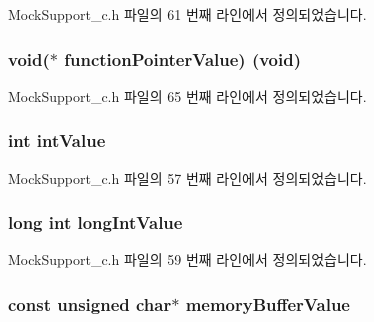 Mock\+Support\+\_\+c.\+h 파일의 61 번째 라인에서 정의되었습니다.

\subsubsection[{\texorpdfstring{function\+Pointer\+Value}{functionPointerValue}}]{\setlength{\rightskip}{0pt plus 5cm}void($\ast$ function\+Pointer\+Value) (void)}\hypertarget{struct_s_mock_value__c_a04eefaf984b7d689bcd2cf4cfd25bff7}{}\label{struct_s_mock_value__c_a04eefaf984b7d689bcd2cf4cfd25bff7}


Mock\+Support\+\_\+c.\+h 파일의 65 번째 라인에서 정의되었습니다.

\subsubsection[{\texorpdfstring{int\+Value}{intValue}}]{\setlength{\rightskip}{0pt plus 5cm}int int\+Value}\hypertarget{struct_s_mock_value__c_a23b7c31b2f6c188e1c281f7be7473f23}{}\label{struct_s_mock_value__c_a23b7c31b2f6c188e1c281f7be7473f23}


Mock\+Support\+\_\+c.\+h 파일의 57 번째 라인에서 정의되었습니다.

\subsubsection[{\texorpdfstring{long\+Int\+Value}{longIntValue}}]{\setlength{\rightskip}{0pt plus 5cm}long int long\+Int\+Value}\hypertarget{struct_s_mock_value__c_a28fbf806ad57d0f25df940b217bd1416}{}\label{struct_s_mock_value__c_a28fbf806ad57d0f25df940b217bd1416}


Mock\+Support\+\_\+c.\+h 파일의 59 번째 라인에서 정의되었습니다.

\subsubsection[{\texorpdfstring{memory\+Buffer\+Value}{memoryBufferValue}}]{\setlength{\rightskip}{0pt plus 5cm}const unsigned char$\ast$ memory\+Buffer\+Value}\hypertarget{struct_s_mock_value__c_aa2c11bfcf011fe08c667cfb10a4a7b61}{}\label{struct_s_mock_value__c_aa2c11bfcf011fe08c667cfb10a4a7b61}


